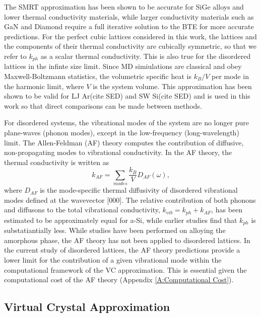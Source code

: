 \documentclass[aps,prb,twocolumn,superscriptaddress,amsmath,amssymb,floatfix]{revtex4}
\begin{document}
The SMRT approximation has been shown to be accurate for SiGe alloys  
and lower thermal conductivity materials, while larger conductivity 
materials such as GaN and Diamond require a full 
iterative solution to the BTE for more accurate predictions.
\cite{garg_role_2011,lindsay_thermal_2012,ward_intrinsic_2010} 
For the perfect cubic lattices considered in this 
work, the lattices and the components of their 
thermal conductivity are cubically symmetric, so that we refer to 
$k_{ph}$ as a scalar thermal conductivity. 
This is also true for the disordered lattices 
in the infinte size limit. 
Since MD simiulations are classical 
and obey Maxwell-Boltzmann 
statistics,\cite{mcquarrie_statistical_2000} the volumetric 
specific heat is $k_{B}/V$ per mode in the harmonic limit, where $V$ 
is the system volume. This approximation has been shown to be valid 
for LJ Ar(cite SED) and SW Si(cite SED) 
and is used 
in this work so that direct comparisons can be made between methods.

For disordered systems, the vibrational modes of the system are no 
longer pure plane-waves (phonon modes), except in the low-frequency 
(long-wavelength) limit. The Allen-Feldman (AF) theory computes 
the contribution of diffusive, non-propagating modes to vibrational 
conductivity.\cite{allen_thermal_1993} 
In the AF theory, the thermal conductivity is written as
\begin{equation}\label{EQ:M:k_AF}
k_{AF} = \sum_{modes} \frac{k_{B}}{V} D_{AF}(\omega),
\end{equation}
where $D_{AF}$ is the mode-specific thermal diffusivity of  
disordered vibrational modes defined at the wavevector [000].   
The relative contribution of both
phonons and diffusons to the total vibrational 
conductivity, $k_{vib} = k_{ph} + k_{AF}$, has been estimated 
to be approximately equal for a-Si,\cite{he_heat_2011} while earlier 
studies find that $k_{ph}$ is substatiantially less.
\cite{feldman_numerical_1999} 
While studies have been performed on alloying the amorphous phase, the 
AF theory has not been applied to disordered lattices.
\cite{feldman_thermal_1993} In the current study of disordered lattices, 
the AF theory predictions provide a lower limit for the contribution 
of a given vibrational mode within the computational 
framework of the VC approximation. This is essential given 
the computational cost of the AF theory 
(Appendix \ref{A:Computational Cost}). 

\subsection{\label{S:Virtual Crystal}Virtual Crystal Approximation}
\end{document}
